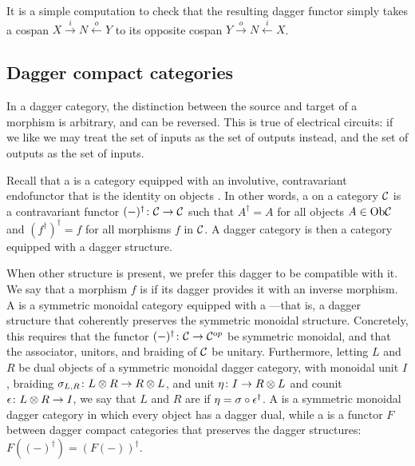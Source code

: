 \begin{example}
  It is a simple computation to check that the resulting dagger functor simply
  takes a cospan $X \stackrel{i}{\longrightarrow} N \stackrel{o}{\longleftarrow}
  Y$ to its opposite cospan $Y \stackrel{o}{\longrightarrow} N
  \stackrel{i}{\longleftarrow} X$.
\end{example}

\subsection{Dagger compact categories} \label{subsec:dagger}

In a dagger category, the distinction between the source and target of a morphism is arbitrary, and can be reversed. This is true of electrical circuits: if we like we may treat the set of inputs as the set of outputs instead, and the set of outputs as the set of inputs.

Recall that a  is a category equipped with an
involutive, contravariant endofunctor that is the identity on objects
\cite{AC,Se}. In other words, a  on a category $\mathcal C$
is a contravariant functor $(-)^\dagger{\colon} \mathcal C \to \mathcal C$ such that
$A^\dagger = A$ for all objects $A \in \mathrm{Ob} \mathcal C$ and $(f^\dagger)^\dagger = f$
for all morphisms $f$ in $\mathcal C$.  A dagger category is then a category equipped
with a dagger structure.

When other structure is present, we prefer this dagger to be compatible with it.
We say that a morphism $f$ is  if its dagger provides it with an
inverse morphism. A  is a symmetric
monoidal category equipped with a ---that is, a dagger structure that coherently preserves the symmetric
monoidal structure. Concretely, this requires that the functor $(-)^\dagger{\colon}
\mathcal C \to \mathcal C^{\mathrm op}$ be symmetric monoidal, and that the associator,
unitors, and braiding of $\mathcal C$ be unitary. Furthermore, letting $L$ and $R$ be
dual objects of a symmetric monoidal dagger category, with monoidal unit $I$,
braiding $\sigma_{L,R}{\colon} L \otimes R \to R \otimes L$, and unit $\eta{\colon} I \to R
\otimes L$ and counit $\epsilon{\colon} L \otimes R \to I$, we say that $L$ and $R$ are
 if $\eta = \sigma \circ \epsilon^\dagger$.  A  is a symmetric monoidal dagger category in which every object
has a dagger dual, while a  is a functor $F$ between
dagger compact categories that preserves the dagger structures: $F((-)^\dagger)
= (F(-))^\dagger$.

